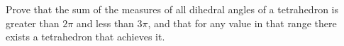 Prove that the sum of the measures of all dihedral angles of a tetrahedron
is greater than $2 \pi$ and less than $3 \pi$,
and that for any value in that range
there exists a tetrahedron that achieves it.
